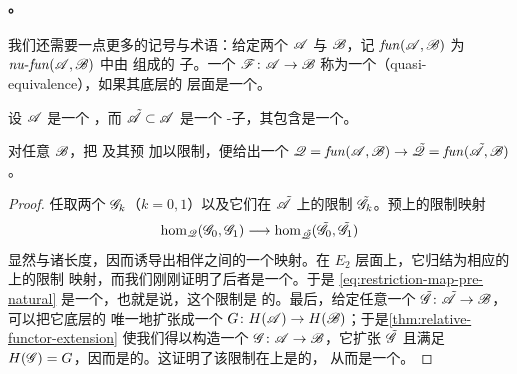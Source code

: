 \paragraph{\trQuasiequivalence。}\label{sub:cunital-quasi-equivalences}
我们还需要一点更多的记号与术语：给定两个 \trCunital{} \trACategory{} $\mathscr{A}$
与 $\mathscr{B}$，记 $\mathit{fun}(\mathscr{A},\mathscr{B})$ 为
$\mathit{nu}\text{-}\mathit{fun}(\mathscr{A},\mathscr{B})$ 中由 \trCunital{} \trAFunctor{}组成的%
\trFull{}子\trCategory。一个 \trCunital{} \trAFunctor{} $\mathscr{F}\colon\mathscr{A}\to\mathscr{B}$
称为一个\textbf{\trQuasiequivalence}（quasi-equivalence），如果其底层的%
\trCohomology{}层面\trFunctor{}是一个\trEquivalence。

设 $\mathscr{A}$ 是一个 \trCunital{} \trACategory，而 $\tilde{\mathscr{A}}\subset\mathscr{A}$
是一个\trFull{} \trAinfty-子\trCategory{}，其包含是一个\trQuasiequivalence。

\begin{lemma}\label{thm:restriction-quasi-equivalence}
对任意 \trCunital{} \trACategory{} $\mathscr{B}$，把 \trCunital{} \trAFunctor{}及其预%
\trNaturalTransformation{}加以限制，便给出一个\trQuasiequivalence{}%
$\mathscr{Q}=\mathit{fun}(\mathscr{A},\mathscr{B})\to\tilde{\mathscr{Q}}
=\mathit{fun}(\tilde{\mathscr{A}},\mathscr{B})$。
\end{lemma}
\begin{proof}
任取两个 \trCunital{} \trAFunctor{} $\mathscr{G}_k$（$k=0,1$）以及它们在
$\tilde{\mathscr{A}}$ 上的限制 $\tilde{\mathscr{G}}_k$。预\trNaturalTransformation{}上的限制映射
\begin{equation}\label{eq:restriction-map-pre-natural}
\hom_{\mathscr{Q}}(\mathscr{G}_0,\mathscr{G}_1)
\longrightarrow\hom_{\tilde{\mathscr{Q}}}(\tilde{\mathscr{G}}_0,\tilde{\mathscr{G}}_1)
\end{equation}
显然与诸长度\trFiltration{}\trCompatible，因而诱导出相伴\trSpectralSequence{}之间的一个映射。在 $E_2$
层面上，它归结为相应\trCohomology{}\trFunctor{}的\trHochschildCohomology{}上的限制
映射，而我们刚刚证明了后者是一个\trIsomorphism。于是
\eqref{eq:restriction-map-pre-natural} 是一个\trQuasiisomorphism，也就是说，这个限制是%
\trCohomology\trFullyFaithful{}的。最后，给定任意一个 \trCunital{} \trAFunctor{}%
$\tilde{\mathscr{G}}\colon\tilde{\mathscr{A}}\to\mathscr{B}$，可以把它底层的\trCohomology{}\trFunctor{}%
唯一地扩张成一个 $G\colon H(\mathscr{A})\to H(\mathscr{B})$；于是\cref{thm:relative-functor-extension}
使我们得以构造一个 $\mathscr{G}\colon\mathscr{A}\to\mathscr{B}$，它扩张 $\tilde{\mathscr{G}}$ 且满足
$H(\mathscr{G})=G$，因而是\trCunital{}的。这证明了该限制在\trObject{}上是\trSurjective{}的，
从而是一个\trQuasiequivalence。
\end{proof}

